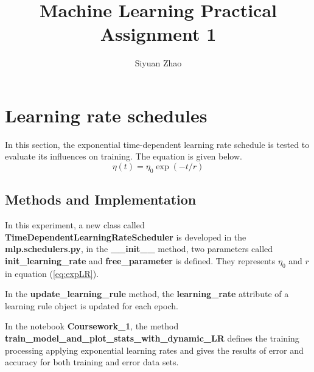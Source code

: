 \documentclass[11pt]{article}
\begin{document}
\title{Machine Learning Practical \\Assignment 1}

\author{Siyuan Zhao}
\maketitle
\section{Learning rate schedules}
In this section, the exponential time-dependent learning rate schedule is tested to evaluate its influences on training. The equation is given below.
\begin{equation}
	\eta(t) = \eta_0\exp (-t/r)
	\label{eq:expLR}
\end{equation}

\subsection{Methods and Implementation}
In this experiment, a new class called {\bf TimeDependentLearningRateScheduler} is developed in the {\bf mlp.schedulers.py}, in the {\bf \_\_init\_\_} method, two parameters called {\bf init\_learning\_rate} and {\bf free\_parameter} is defined. They represents $\eta_0$ and $r$ in equation (\ref{eq:expLR}).

In the {\bf update\_learning\_rule} method, the {\bf learning\_rate} attribute of a learning rule object is updated for each epoch.

In the notebook {\bf Coursework\_1}, the method {\bf train\_model\_and\_plot\_stats\_with\_dynamic\_LR} defines the training processing applying exponential learning rates and gives the results of error and accuracy for both training and error data sets.
\end{document}
